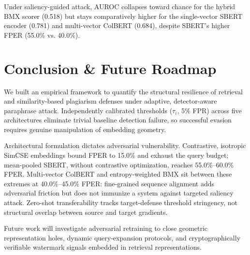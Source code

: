 \documentclass[conference,onecolumn,11pt]{IEEEtran}
\begin{document}
Under saliency-guided attack, AUROC collapses toward chance for the hybrid BMX scorer (0.518) but stays comparatively higher for the single-vector SBERT encoder (0.781) and multi-vector ColBERT (0.684), despite SBERT's higher FPER (55.0\% vs. 40.0\%).

\section{Conclusion \& Future Roadmap}
\label{sec:conclusion}

We built an empirical framework to quantify the structural resilience of retrieval and similarity-based plagiarism defenses under adaptive, detector-aware paraphrase attack. Independently calibrated thresholds ($\tau_i$, 5\% FPR) across five architectures eliminate trivial baseline detection failure, so successful evasion requires genuine manipulation of embedding geometry.

Architectural formulation dictates adversarial vulnerability. Contrastive, isotropic SimCSE embeddings bound FPER to 15.0\% and exhaust the query budget; mean-pooled SBERT, without contrastive optimization, reaches 55.0\%--60.0\% FPER. Multi-vector ColBERT and entropy-weighted BMX sit between these extremes at 40.0\%--45.0\% FPER: fine-grained sequence alignment adds adversarial friction but does not immunize a system against targeted saliency attack. Zero-shot transferability tracks target-defense threshold stringency, not structural overlap between source and target gradients.

Future work will investigate adversarial retraining to close geometric representation holes, dynamic query-expansion protocols, and cryptographically verifiable watermark signals embedded in retrieval representations.
\end{document}
